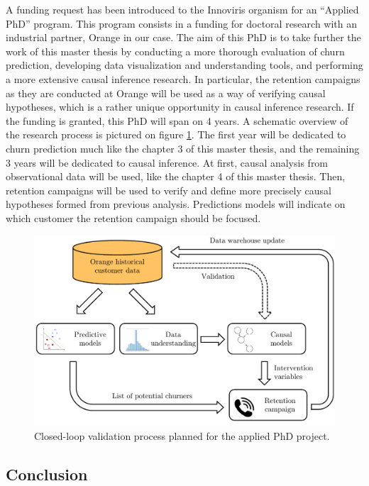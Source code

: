 A funding request has been introduced to the Innoviris organism for an ``Applied
PhD'' program. This program consists in a funding for doctoral research with an
industrial partner, Orange in our case. The aim of this PhD is to take further
the work of this master thesis by conducting a more thorough evaluation of churn
prediction, developing data visualization and understanding tools, and
performing a more extensive causal inference research. In particular, the
retention campaigns as they are conducted at Orange will be used as a way of
verifying causal hypotheses, which is a rather unique opportunity in causal
inference research. If the funding is granted, this PhD will span on 4 years. A
schematic overview of the research process is pictured on figure
\ref{fig:machu-picchu}. The first year will be dedicated to churn prediction
much like the chapter 3 of this master thesis, and the remaining 3 years will be
dedicated to causal inference. At first, causal analysis from observational data
will be used, like the chapter 4 of this master thesis. Then, retention
campaigns will be used to verify and define more precisely causal hypotheses
formed from previous analysis. Predictions models will indicate on which
customer the retention campaign should be focused.

\begin{figure}
    \centering
	\includegraphics[width=0.95\linewidth]{figures/machu-picchu.pdf}
	\caption{Closed-loop validation process planned for the applied PhD
	project.}
	\label{fig:machu-picchu}
\end{figure}

\subsection{Conclusion}

